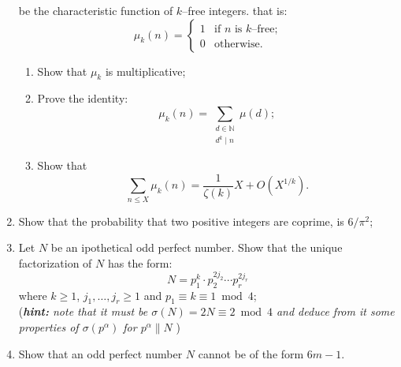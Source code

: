 \documentclass[a4paper,10pt]{article}
\begin{document}
\begin{enumerate}
be the characteristic function of $k$--free integers. that is:
$$\mu_k(n)=\begin{cases}1&\text{if }n\text{ is $k$--free;}\\ 0& \text{otherwise.}\end{cases}$$
\begin{enumerate}
 \item Show that $\mu_k$ is multiplicative;
 \item Prove the identity: 
 $$\mu_k(n)=\sum_{\substack{d\in\mathbb N\\ d^k\mid n}}\mu(d);$$
 \item Show that $$\sum_{n\le X}\mu_k(n)=\frac1{\zeta(k)}X+O(X^{1/k}).$$
 \end{enumerate}
 \item Show that the probability that two positive integers are coprime, is $6/\pi^2$;
 \item Let $N$ be an ipothetical odd perfect number. Show that the unique factorization of $N$ has the form:
 $$N=p_1^k\cdot p_2^{2j_2}\cdots p_r^{2j_r}$$
 where $k\ge1$, $j_1,\ldots,j_r\ge1$ and $p_1\equiv k\equiv 1\bmod 4$;\\
 \small{(\textit{\textbf{hint:} 
 note that it must be $\sigma(N)=2N\equiv2\bmod4$ and deduce from it some properties of $\sigma(p^\alpha)$
 for $p^\alpha\|N$
 })}
 \item Show that an odd perfect number $N$ cannot be of the form $6m-1$. 
  \end{enumerate}
\end{document}
